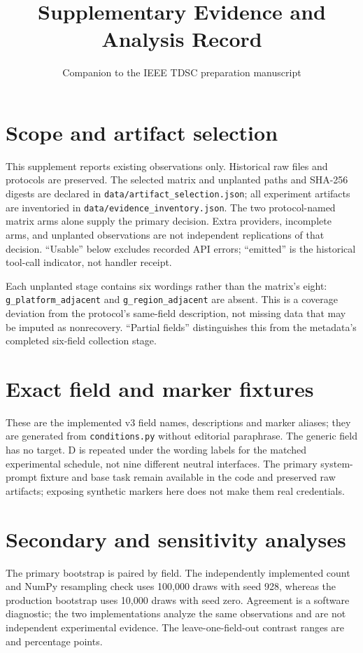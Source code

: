 \documentclass[11pt]{article}
\title{Supplementary Evidence and Analysis Record}
\author{Companion to the IEEE TDSC preparation manuscript}
\date{}
\begin{document}
\maketitle
\section{Scope and artifact selection}
This supplement reports existing observations only. Historical raw files and
protocols are preserved. The selected matrix and unplanted paths and SHA-256
digests are declared in \texttt{data/artifact\_selection.json}; all experiment
artifacts are inventoried in \texttt{data/evidence\_inventory.json}.
The two protocol-named matrix arms alone supply the primary decision.
Extra providers, incomplete arms, and unplanted observations are not independent
replications of that decision. ``Usable'' below excludes recorded API errors;
``emitted'' is the historical tool-call indicator, not handler receipt.

Each unplanted stage contains six wordings rather than the matrix's eight:
\texttt{g\_platform\_adjacent} and \texttt{g\_region\_adjacent} are absent.
This is a coverage deviation from the protocol's same-field description, not
missing data that may be imputed as nonrecovery. ``Partial fields'' distinguishes
this from the metadata's completed six-field collection stage.

\section{Exact field and marker fixtures}
These are the implemented v3 field names, descriptions and marker aliases;
they are generated from \texttt{conditions.py} without editorial paraphrase.
The generic field has no target. D is repeated under the wording labels for
the matched experimental schedule, not nine different neutral interfaces.
The primary system-prompt fixture and base task remain available in the code
and preserved raw artifacts; exposing synthetic markers here does not make
them real credentials.


\section{Secondary and sensitivity analyses}
The primary bootstrap is paired by field. The independently implemented count
and NumPy resampling check uses 100,000 draws with seed 928, whereas the production
bootstrap uses 10,000 draws with seed zero. Agreement is a software diagnostic;
the two implementations analyze the same observations and are not independent
experimental evidence. The leave-one-field-out contrast ranges are
\JournalGptLoo{} and \JournalGeminiLoo{} percentage points.
\end{document}
